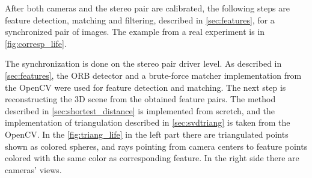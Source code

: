 After both cameras and the stereo pair are calibrated, the following steps are feature detection, matching and filtering, described in \autoref{sec:features}, for a synchronized pair of images. 
The example from a real experiment is in \autoref{fig:corresp_life}.

The synchronization is done on the stereo pair driver level.
As described in \autoref{sec:features}, the ORB detector and a brute-force matcher implementation from the OpenCV were used for feature detection and matching.
The next step is reconstructing the 3D scene from the obtained feature pairs.
The method described in \autoref{sec:shortest_distance} is implemented from scretch, and the implementation of triangulation described in \autoref{sec:svdtriang} is taken from the OpenCV.
In the \autoref{fig:triang_life} in the left part there are triangulated points shown as colored spheres, and rays pointing from camera centers to feature points colored with the same color as corresponding feature.
In the right side there are cameras' views.


